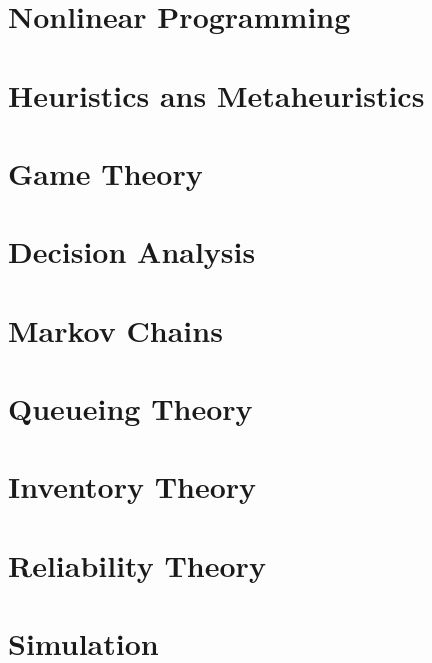 \documentclass[10pt, twocolumn]{book}
\begin{document}
\part{Nonlinear Programming}

\part{Heuristics ans Metaheuristics}

\part{Game Theory}

\part{Decision Analysis}

\part{Markov Chains}

\part{Queueing Theory}

\part{Inventory Theory}

\part{Reliability Theory}

\part{Simulation}
\end{document}
